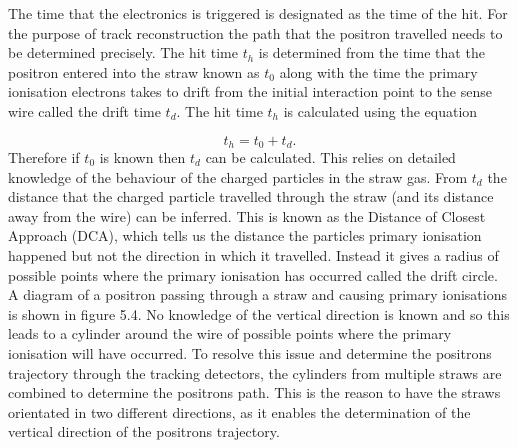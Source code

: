 The time that the electronics is triggered is designated as the time of the hit. For the purpose of track reconstruction the path that the positron travelled needs to be determined precisely. The hit time $t_{h}$ is determined from the time that the positron entered into the straw known as $t_{0}$ along with the time the primary ionisation electrons takes to drift from the initial interaction point to the sense wire called the drift time $t_{d}$. The hit time $t_{h}$ is calculated using the equation

\begin{equation}
t_{h} = t_{0} + t_{d}.
\end{equation}
\noindent
Therefore if $t_{0}$ is known then $t_{d}$ can be calculated. This relies on detailed knowledge of the behaviour of the charged particles in the straw gas. From $t_{d}$ the distance that the charged particle travelled through the straw (and its distance away from the wire) can be inferred. This is known as the Distance of Closest Approach (DCA), which tells us the distance the particles primary ionisation happened but not the direction in which it travelled. Instead it gives a radius of possible points where the primary ionisation has occurred called the drift circle. A diagram of a positron passing through a straw and causing primary ionisations is shown in figure 5.4. No knowledge of the vertical direction is known and so this leads to a cylinder around the wire of possible points where the primary ionisation will have occurred. To resolve this issue and determine the positrons trajectory through the tracking detectors, the cylinders from multiple straws are combined to determine the positrons path. This is the reason to have the straws orientated in two different directions, as it enables the determination of the vertical direction of the positrons trajectory. 

